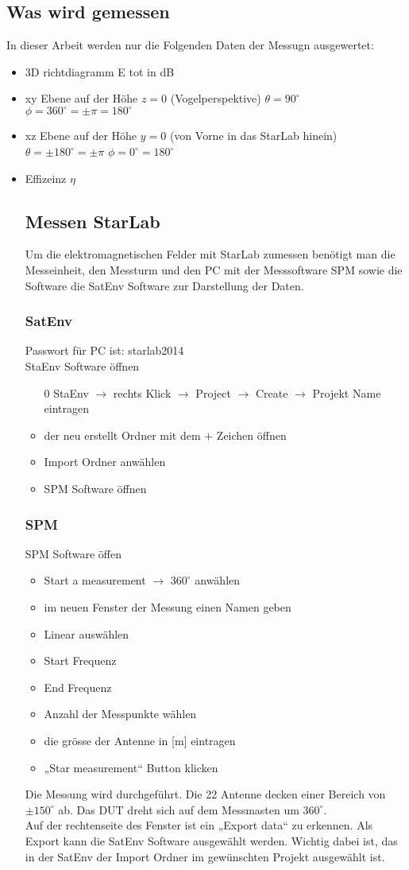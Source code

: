 \subsection{Was wird gemessen}
In dieser Arbeit werden nur die Folgenden Daten der Messugn ausgewertet:
\begin{itemize}
	\item 3D richtdiagramm E tot in dB
	\item xy Ebene auf der Höhe $z=0$ (Vogelperspektive) $\theta=90^\circ$ $\phi=360^\circ= \pm \pi=180^\circ$
	\item xz Ebene auf der Höhe $y=0$ (von Vorne in das StarLab hinein) $\theta=\pm 180^\circ =\pm \pi$ $\phi= 0^\circ = 180^\circ$
	\item Effizeinz $\eta$
	\subsection{Messen StarLab}
	Um die elektromagnetischen Felder mit StarLab zumessen benötigt man  die Messeinheit, den Messturm und den PC mit der Messsoftware SPM sowie die Software die SatEnv Software  zur Darstellung der Daten.
	\subsubsection{SatEnv}
	Passwort für PC ist: starlab2014\\
	StaEnv Software öffnen
	\begin{itemize}
	\item [0]StaEnv $\rightarrow$ rechts Klick $\rightarrow$ Project $\rightarrow$ Create $\rightarrow$ Projekt Name eintragen
	\item der neu erstellt Ordner mit dem $+$ Zeichen öffnen
	\item Import Ordner anwählen
	\item SPM Software öffnen
	\end{itemize}
	\subsubsection{SPM}
	SPM Software öffen
	\begin{itemize}
	\item Start a measurement $\rightarrow$ $360^\circ$ anwählen 
	\item im neuen Fenster der Messung einen Namen geben
	\item Linear auswählen
	\item Start Frequenz
	\item End Frequenz 
	\item Anzahl der Messpunkte wählen
	\item die grösse der Antenne in [m] eintragen
	\item „Star measurement“ Button klicken
	\end{itemize}
	Die Messung wird durchgeführt. Die 22 Antenne decken einer Bereich von $\pm 150^\circ$ ab. Das DUT dreht sich auf dem Messmasten um $360^\circ$.\\
	Auf der rechtenseite des Fenster ist ein „Export data“ zu erkennen. Als Export kann die SatEnv Software ausgewählt werden. Wichtig dabei ist, das in der SatEnv der Import Ordner im gewünschten Projekt ausgewählt ist.
	

\end{itemize}
